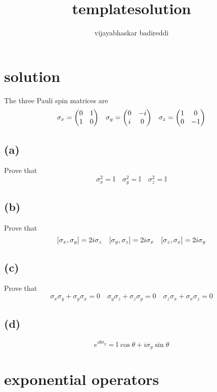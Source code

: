 \documentclass[12pt] {article}
\title{templatesolution}
\author{vijayabhaskar badireddi}
\begin{document}
        
\section*{solution}
The three Pauli spin matrices are 
\[\sigma_x=\mqty(0 & 1 \\ 1 & 0)\quad\sigma_y=\mqty(0 & -i \\ i & 0)\quad\sigma_z=\mqty(1 & 0 \\ 0 & -1)\]
\subsection*{(a)}
Prove that 
\[\sigma_x^2=\mathbb{I}\quad\sigma_y^2=\mathbb{I}\quad\sigma_z^2=\mathbb{I}\]
\subsection*{(b)}
Prove that
\[\comm{\sigma_x}{\sigma_y}=2i\sigma_z\quad\comm{\sigma_y}{\sigma_z}=2i\sigma_x\quad\comm{\sigma_z}{\sigma_x}=2i\sigma_y\]
\subsection*{(c)}
Prove that
\[\sigma_x\sigma_y+\sigma_y\sigma_x=0\quad\sigma_y\sigma_z+\sigma_z\sigma_y=0\quad\sigma_z\sigma_x+\sigma_x\sigma_z=0\]
\subsection*{(d)}
\[e^{i\theta\sigma_y}=\mathbb{I}\cos\theta+i\sigma_y\sin\theta\]

\newpage
\section*{exponential operators}
\end{document}
